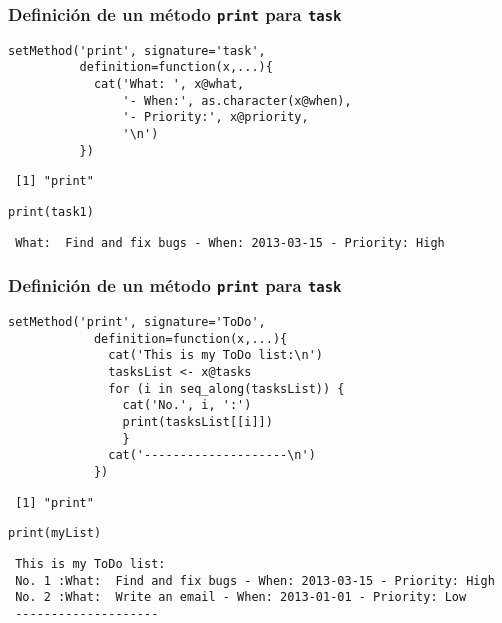 \documentclass[xcolor={usenames,svgnames,dvipsnames}]{beamer}
\begin{document}
\begin{frame}[fragile]
\frametitle{Definición de un método \texttt{print} para \texttt{task}}
\label{sec-3-2-2}


\lstset{language=R}
\begin{lstlisting}
setMethod('print', signature='task',
          definition=function(x,...){
            cat('What: ', x@what,
                '- When:', as.character(x@when),
                '- Priority:', x@priority,
                '\n')
          })
\end{lstlisting}

\begin{verbatim}
 [1] "print"
\end{verbatim}



\lstset{language=R}
\begin{lstlisting}
print(task1)
\end{lstlisting}

\begin{verbatim}
 What:  Find and fix bugs - When: 2013-03-15 - Priority: High
\end{verbatim}
\end{frame}
\begin{frame}[fragile]
\frametitle{Definición de un método \texttt{print} para \texttt{task}}
\label{sec-3-2-3}


\lstset{language=R}
\begin{lstlisting}
setMethod('print', signature='ToDo',
            definition=function(x,...){
              cat('This is my ToDo list:\n')
              tasksList <- x@tasks
              for (i in seq_along(tasksList)) {
                cat('No.', i, ':')
                print(tasksList[[i]])
                }
              cat('--------------------\n')
            })
\end{lstlisting}

\begin{verbatim}
 [1] "print"
\end{verbatim}


\lstset{language=R}
\begin{lstlisting}
print(myList)
\end{lstlisting}

\begin{verbatim}
 This is my ToDo list:
 No. 1 :What:  Find and fix bugs - When: 2013-03-15 - Priority: High 
 No. 2 :What:  Write an email - When: 2013-01-01 - Priority: Low 
 --------------------
\end{verbatim}
\end{frame}
\end{document}
